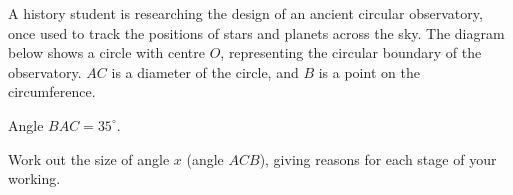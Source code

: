 \begin{question}
\noindent A history student is researching the design of an ancient circular observatory, once used to track the positions of stars and planets across the sky. The diagram below shows a circle with centre $O$, representing the circular boundary of the observatory. $AC$ is a diameter of the circle, and $B$ is a point on the circumference.

\begin{center}
\end{center}

\noindent Angle $BAC = 35^\circ$.

\noindent Work out the size of angle $x$ (angle $ACB$), giving reasons for each stage of your working.
\vspace{4cm}
\begin{flushright}
\end{flushright}
\end{question}